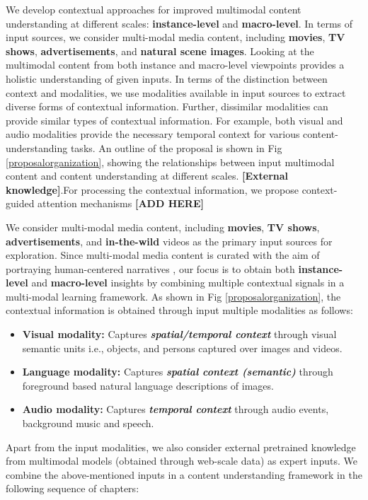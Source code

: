 We develop contextual approaches for improved multimodal content understanding at different scales: \textbf{instance-level} and \textbf{macro-level}.  In terms of input sources, we consider multi-modal media content, including \textbf{movies}, \textbf{TV shows}, \textbf{advertisements}, and \textbf{natural scene images}. Looking at the multimodal content from both instance and macro-level viewpoints provides a holistic understanding of given inputs. In terms of the distinction between context and modalities, we use modalities available in input sources to extract diverse forms of contextual information. Further, dissimilar modalities can provide similar types of contextual information. For example, both visual and audio modalities provide the necessary temporal context for various content-understanding tasks. An outline of the proposal is shown in Fig \ref{proposalorganization}, showing the relationships between input multimodal content and content understanding at different scales. \textbf{[External knowledge]}.For processing the contextual information, we propose context-guided attention mechanisms \textbf{[ADD HERE]}



We consider multi-modal media content, including \textbf{movies}, \textbf{TV shows}, \textbf{advertisements}, and \textbf{in-the-wild} videos as the primary input sources for exploration. Since multi-modal media content is curated with the aim of portraying human-centered narratives \cite{CMI}, our focus is to obtain both \textbf{instance-level} and \textbf{macro-level} insights by combining multiple contextual signals in a multi-modal learning framework. As shown in Fig \ref{proposalorganization}, the contextual information is obtained through input multiple modalities as follows:

\begin{itemize}
    \item  \textbf{Visual modality:} Captures \textbf{\textit{spatial/temporal context}} through visual semantic units i.e., objects, and persons captured over images and videos.
    \item  \textbf{Language modality:} Captures \textbf{\textit{spatial context (semantic)}} through foreground based natural language descriptions of images.
    \item  \textbf{Audio modality:} Captures \textbf{\textit{temporal context}} through audio events, background music and speech.

\end{itemize}
Apart from the input modalities, we also consider external pretrained knowledge from multimodal models (obtained through web-scale data) as expert inputs.
We combine the above-mentioned inputs in a content understanding framework in the following sequence of chapters:

